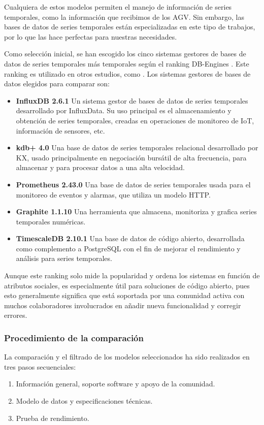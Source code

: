 Cualquiera de estos modelos permiten el manejo de información de series temporales, como la información que recibimos
de los AGV. Sin embargo, las bases de datos de series temporales están especializadas en este tipo de trabajos, por lo que
las hace perfectas para nuestras necesidades.

Como selección inicial, se han escogido los cinco sistemas gestores de bases de datos de series temporales más temporales
según el ranking DB-Engines \cite{dbengines:rankingTSDBMS}. Este ranking es utilizado en otros estudios, como \cite{10.1007/978-3-030-50426-7_28}.
Los sistemas gestores de bases de datos elegidos para comparar son:

\begin{itemize}
    \item \textbf{InfluxDB 2.6.1} Un sistema gestor de bases de datos de series temporales desarrollado por InfluxData. Su
        uso principal es el almacenamiento y obtención de series temporales, creadas en operaciones de monitoreo de IoT,
        información de sensores, etc.
    \item \textbf{kdb+ 4.0} Una base de datos de series temporales relacional desarrollado por KX, usado principalmente en
        negociación bursátil de alta frecuencia, para almacenar y para procesar datos a una alta velocidad.
    \item \textbf{Prometheus 2.43.0} Una base de datos de series temporales usada para el monitoreo de eventos y alarmas, que
        utiliza un modelo HTTP.
    \item \textbf{Graphite 1.1.10} Una herramienta que almacena, monitoriza y grafica series temporales numéricas.   
    \item \textbf{TimescaleDB 2.10.1} Una base de datos de código abierto, desarrollada como complemento a PostgreSQL con el
        fin de mejorar el rendimiento y análisis para series temporales.
\end{itemize}

Aunque este ranking solo mide la popularidad y ordena los sistemas en función de atributos sociales, es especialmente
útil para soluciones de código abierto, pues esto generalmente significa que está soportada por una comunidad activa
con muchos colaboradores involucrados en añadir nueva funcionalidad y corregir errores.

\subsubsection{Procedimiento de la comparación}
La comparación y el filtrado de los modelos seleccionados ha sido realizados en tres pasos secuenciales:
\begin{enumerate}
    \item Información general, soporte software y apoyo de la comunidad.
    \item Modelo de datos y especificaciones técnicas.
    \item Prueba de rendimiento.
\end{enumerate}

